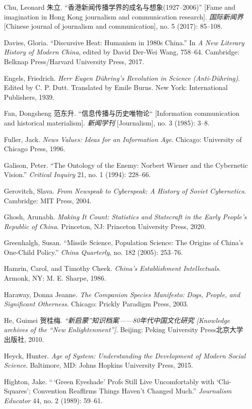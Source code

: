\documentclass{tufte-handout}
\begin{document}
\begin{hangparas}{.25in}{1}
\begin{CJK*}{UTF8}{gbsn}
Chu, Leonard 朱立. ``香港新闻传播学界的成名与想象(1927--2006)'' {[}Fame
and imagination in Hong Kong journalism and communication research{]}.
\emph{国际新闻界} {[}Chinese journal of journalism and communication{]},
no. 5 (2017): 85--108.

Davies, Gloria. ``Discursive Heat: Humanism in 1980s China.'' In \emph{A
New Literary History of Modern China}, edited by David Der-Wei Wang,
758--64. Cambridge: Belknap Press/Harvard University Press, 2017.

Engels, Friedrich. \emph{Herr Eugen Dühring's Revolution in Science
(Anti-Dühring)}. Edited by C. P. Dutt. Translated by Emile Burns. New
York: International Publishers, 1939.

Fan, Dongsheng 范东升. ``信息传播与历史唯物论`` {[}Information
communication and historical materialism{]}. \emph{新闻学刊}
{[}Journalism{]}, no. 3 (1985): 3--8.

Fuller, Jack. \emph{News Values: Ideas for an Information Age}. Chicago:
University of Chicago Press, 1996.

Galison, Peter. ``The Ontology of the Enemy: Norbert Wiener and the
Cybernetic Vision.'' \emph{Critical Inquiry} 21, no. 1 (1994): 228--66.

Gerovitch, Slava. \emph{From Newspeak to Cyberspeak: A History of Soviet
Cybernetics}. Cambridge: MIT Press, 2004.

Ghosh, Arunabh. \emph{Making It Count: Statistics and Statecraft in the
Early People's Republic of China}. Princeton, NJ: Princeton University
Press, 2020.

Greenhalgh, Susan. ``Missile Science, Population Science: The Origins of
China's One-Child Policy.'' \emph{China Quarterly}, no. 182 (2005):
253--76.

Hamrin, Carol, and Timothy Cheek. \emph{China's Establishment
Intellectuals}. Armonk, NY: M. E. Sharpe, 1986.

Haraway, Donna Jeanne. \emph{The Companion Species Manifesto: Dogs,
People, and Significant Otherness}. Chicago: Prickly Paradigm Press,
2003.

He, Guimei 贺桂梅. \emph{``新启蒙''知识档案------80年代中国文化研究
{[}Knowledge archives of the ``New Enlightenment''{]}}. Beijing: Peking
University Press北京大学出版社, 2010.

Heyck, Hunter. \emph{Age of System: Understanding the Development of
Modern Social Science}. Baltimore, MD: Johns Hopkins University Press,
2015.

Highton, Jake. ``\,`Green Eyeshade' Profs Still Live Uncomfortably with
`Chi-Squares'; Convention Reaffirms Things Haven't Changed Much.''\emph{
Journalism Educator} 44, no. 2 (1989): 59--61.


\end{CJK*}
\end{hangparas}
\end{document}
